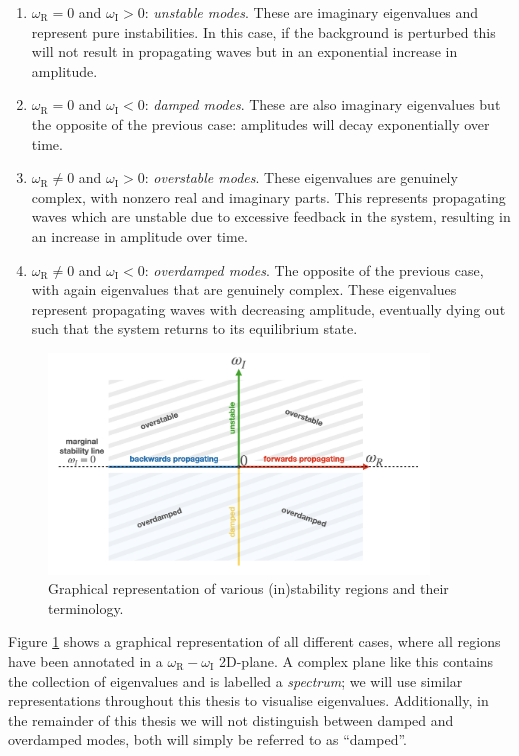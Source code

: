 \begin{enumerate}
  \item $\omega_\text{R} = 0$ and $\omega_\text{I} > 0$: \emph{unstable modes}. These are imaginary eigenvalues and represent pure instabilities. In this case, if the background is perturbed this will not result in propagating waves but in an exponential increase in amplitude.
  \item $\omega_\text{R} = 0$ and $\omega_\text{I} < 0$: \emph{damped modes}. These are also imaginary eigenvalues but the opposite of the previous case: amplitudes will decay exponentially over time.
  \item $\omega_\text{R} \neq 0$ and $\omega_\text{I} > 0$: \emph{overstable modes}. These eigenvalues are genuinely complex, with nonzero real and imaginary parts. This represents propagating waves which are unstable due to excessive feedback in the system, resulting in an increase in amplitude over time.
  \item$\omega_\text{R} \neq 0$ and $\omega_\text{I} < 0$: \emph{overdamped modes}. The opposite of the previous case, with again eigenvalues that are genuinely complex. These eigenvalues represent propagating waves with decreasing amplitude, eventually dying out such that the system returns to its equilibrium state.
\end{enumerate}

\begin{figure}[t]
  \centering
  \includegraphics[width=0.9\textwidth]{spectral_plane.png}
  \caption{Graphical representation of various (in)stability regions and their terminology.}
  \label{fig: spectral_plane}
\end{figure}

Figure \ref{fig: spectral_plane} shows a graphical representation of all different cases, where all regions have been annotated in a $\omega_\text{R} - \omega_\text{I}$ 2D-plane. A complex plane like this contains the collection of eigenvalues and is labelled a \emph{spectrum}; we will use similar representations throughout this thesis to visualise eigenvalues. Additionally, in the remainder of this thesis we will not distinguish between damped and overdamped modes, both will simply be referred to as ``damped''.


